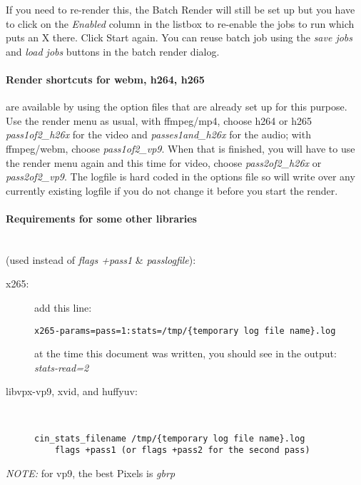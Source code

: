 If you need to re-render this, the Batch Render will still be set up but you have to click on the \textit{Enabled} column in the listbox to re-enable the jobs to run which puts an X there.  Click Start again. You can reuse batch job using the \textit{save jobs} and \textit{load jobs} buttons in the batch render dialog.

\paragraph{Render shortcuts for webm, h264, h265} are available by using the option files that are already set up for this purpose.  Use the render menu as usual, with ffmpeg/mp4, choose h264 or h265 \textit{pass1of2\_h26x} for the video and \textit{passes1and\_h26x} for the audio;
with ffmpeg/webm, choose \textit{pass1of2\_vp9}.  When that is finished, you will have to use the render menu again and this time for video, choose \textit{pass2of2\_h26x} or \textit{pass2of2\_vp9}.  The logfile is hard coded in the options file so will write over any currently existing logfile if you do not change it before you start the render.

\paragraph{Requirements for some other libraries} ~\\ (used instead of \textit{flags +pass1} \& \textit{passlogfile}):

\begin{description}
    \item[x265:] add this line:
    \begin{lstlisting}[style=sh]
x265-params=pass=1:stats=/tmp/{temporary log file name}.log
    \end{lstlisting}
    at the time this document was written, you should see in the output: \\  \textit{stats-read=2}

    \item[libvpx-vp9, xvid, and huffyuv:]~

    \begin{lstlisting}[style=sh]
    cin_stats_filename /tmp/{temporary log file name}.log
    flags +pass1 (or flags +pass2 for the second pass)
    \end{lstlisting}
\end{description}

\textit{NOTE:} for vp9, the best Pixels is \textit{gbrp}

